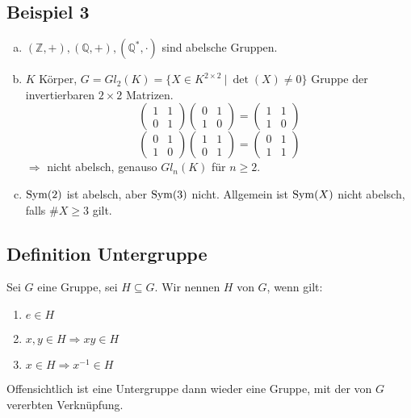 \subsection{Beispiel 3}
\label{sub:beispiel_3}
\begin{enumerate}[(a)]
	\item $(\mathds{Z}, +), (\mathds{Q}, +), (\mathds{Q}^*,\cdot)$ sind abelsche Gruppen.
	\item $K$ Körper, $G=Gl_2(K)=\{X \in K^{2\times 2}~ |~ \det(X)\not= 0 \}$ Gruppe der invertierbaren $2 \times 2$ Matrizen.\\
\[
	\begin{pmatrix}	1 & 1\\ 0 & 1 \end{pmatrix}
	\begin{pmatrix} 0 & 1\\	1 & 0 \end{pmatrix}
	=
	\begin{pmatrix}	1 & 1\\	1 & 0 \end{pmatrix}
\]
\[
	\begin{pmatrix} 0 & 1\\	1 & 0 \end{pmatrix}
	\begin{pmatrix} 1 & 1\\ 0 & 1 \end{pmatrix}
	=
	\begin{pmatrix} 0 & 1\\ 1 & 1 \end{pmatrix}
\]
	$\Rightarrow$ nicht abelsch, genauso $Gl_n(K)$ für $n\ge 2$.
	\item $\operatorname{Sym}(2)$ ist abelsch, aber $\operatorname{Sym}(3)$ nicht. Allgemein ist $\operatorname{Sym}(X)$ nicht abelsch, falls $\#X \ge 3$ gilt.
\end{enumerate}

\subsection{Definition Untergruppe}
\label{sub: def_untergruppe}
Sei $G$ eine Gruppe, sei $H\subseteq G$. 
Wir nennen $H$   von $G$, wenn gilt:
\begin{enumerate}[(UG1)]
	\item $e\in H$
	\item $x,y\in H \Rightarrow xy\in H$
	\item $x\in H \Rightarrow x^{-1} \in H$
\end{enumerate}
Offensichtlich ist eine Untergruppe dann wieder eine Gruppe, mit der von $G$ vererbten Verknüpfung.

